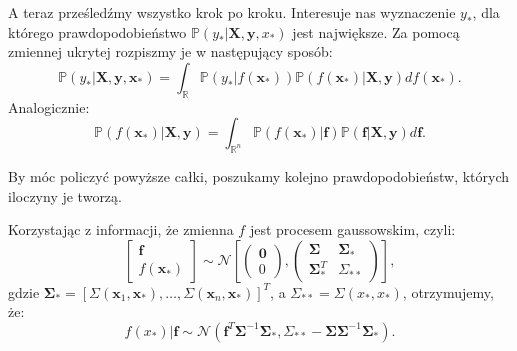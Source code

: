 \documentclass{mini}
\begin{document}
A teraz prześledźmy wszystko krok po kroku. Interesuje nas wyznaczenie $y_{\ast}$, dla którego prawdopodobieństwo $\mathbb{P}(y_{\ast} | \textbf{X}, \textbf{y}, x_{\ast})$ jest największe. Za pomocą zmiennej ukrytej rozpiszmy je w następujący sposób:
\begin{equation}\label{calka1}
\mathbb{P}(y_{\ast} | \textbf{X}, \textbf{y}, \mathbf{x}_{\ast}) = \int_{\mathbb{R}} \mathbb{P}(y_{\ast} | f(\mathbf{x}_{\ast}))\mathbb{P}(f(\mathbf{x}_{\ast}) | \textbf{X}, \textbf{y}) df(\mathbf{x}_{\ast}).
\end{equation}
Analogicznie:
\begin{equation}\label{calka2}
\mathbb{P}(f(\mathbf{x}_{\ast}) | \textbf{X}, \textbf{y}) = \int_{\mathbb{R}^n} \mathbb{P}(f(\mathbf{x}_{\ast}) | \mathbf{f})\mathbb{P}(\mathbf{f} | \textbf{X}, \textbf{y}) d\mathbf{f}.
\end{equation}

By móc policzyć powyższe całki, poszukamy kolejno prawdopodobieństw, których iloczyny je tworzą.

Korzystając z informacji, że zmienna $f$ jest procesem gaussowskim, czyli:
$$
\left[
	\begin{array}{c}
		\mathbf{f}\\
		f(\mathbf{x}_{\ast})
	\end{array}
\right] \sim \mathcal{N}
\left[
\left(
	\begin{array}{c}
		\mathbf{0}\\
		0
	\end{array}
\right)
,
\left(
	\begin{array}{cc}
		\mathbf{\Sigma} & \mathbf{\Sigma}_{\ast}\\
		\mathbf{\Sigma}_{\ast}^T & \Sigma_{\ast\ast}
	\end{array}
\right)
\right],
$$ 
gdzie $\mathbf{\Sigma}_{\ast} = [\Sigma(\mathbf{x}_1, \mathbf{x}_{\ast}), \ldots, \Sigma(\mathbf{x}_n, \mathbf{x}_{\ast})]^T$, a $\Sigma_{\ast\ast} = \Sigma(x_{\ast}, x_{\ast})$, otrzymujemy, że: 
\begin{equation}\label{calka21}
f(x_{\ast}) | \mathbf{f} \sim \mathcal{N}(\mathbf{f}^T\mathbf{\Sigma}^{-1}\mathbf{\Sigma}_{\ast}, \Sigma_{\ast\ast} - \mathbf{\Sigma}\mathbf{\Sigma}^{-1}\mathbf{\Sigma}_{\ast} ).
\end{equation}
\end{document}
